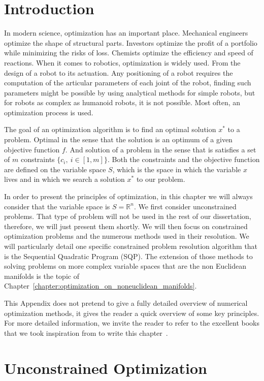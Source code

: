\section{Introduction}
In modern science, optimization has an important place.
Mechanical engineers optimize the shape of structural parts.
Investors optimize the profit of a portfolio while minimizing the risks of loss.
Chemists optimize the efficiency and speed of reactions.
When it comes to robotics, optimization is widely used.
From the design of a robot to its actuation.
Any positioning of a robot requires the computation of the articular parameters of each joint of the robot, finding such parameters might be possible by using analytical methods for simple robots, but for robots as complex as humanoid robots, it is not possible.
Most often, an optimization process is used.

The goal of an optimization algorithm is to find an optimal solution $x^*$ to a problem.
Optimal in the sense that the solution is an optimum of a given objective function $f$.
And solution of a problem in the sense that is satisfies a set of $m$ constraints $\{c_i,\ i\in [1,m]\}$.
Both the constraints and the objective function are defined on the variable space $\mathit{S}$, which is the space in which the variable $x$ lives and in which we search a solution $x^*$ to our problem.

In order to present the principles of optimization, in this chapter we will always consider that the variable space is $\mathit{S}=\mathbb{R}^n$.
We first consider unconstrained problems.
That type of problem will not be used in the rest of our dissertation, therefore, we will just present them shortly.
We will then focus on constrained optimization problems and the numerous methods used in their resolution.
We will particularly detail one specific constrained problem resolution algorithm that is the Sequential Quadratic Program (SQP).
The extension of those methods to solving problems on more complex variable spaces that are the non Euclidean manifolds is the topic of Chapter~\ref{chapter:optimization_on_noneuclidean_manifolds}.

This Appendix does not pretend to give a fully detailed overview of numerical optimization methods, it gives the reader a quick overview of some key principles.
For more detailed information, we invite the reader to refer to the excellent books that we took inspiration from to write this chapter~\cite{nocedal:book:2006, bonnans:book:2003, boyd2004convex}.

\section{Unconstrained Optimization}

